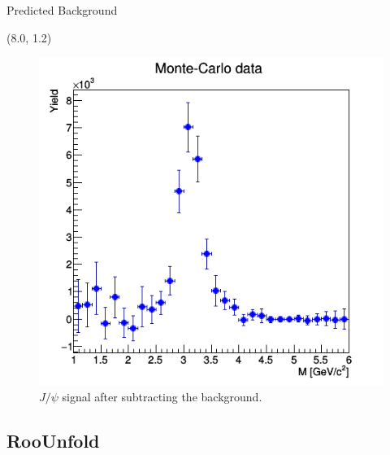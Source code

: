 \documentclass[10pt, xcolor={dvipsnames}, aspectratio = 169]{beamer}
\newcommand{\jpsi}{$J/\psi$ }
\begin{document}
\begin{frame}{Predicted Background}
\begin{textblock}{7.0}(8.0, 1.2)
\begin{figure}
    \centering
    \includegraphics[width = 1.0\linewidth]{imgs/signal_hist000.png}
    \caption{\jpsi signal after subtracting the background.}
\end{figure}
\end{textblock}

\end{frame}

%
%

\subsection{RooUnfold}
\end{document}
